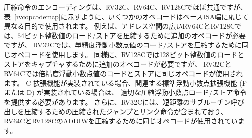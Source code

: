 圧縮命令のエンコーディングは、RV32C、RV64C、RV128Cでほぼ共通ですが、
表~\ref{rvcopcodemap}に示すように、いくつかのオペコードはベースISA幅に応じて異なる目的で使用されます。
例えば、アドレス空間の広いRV64CとRV128Cでは、64ビット整数値のロード/ストアを圧縮するために追加のオペコードが必要ですが、
RV32Cでは、単精度浮動小数点値のロード/ストアを圧縮するために同じオペコードを使用します。
同様に、RV128Cでは128ビット整数値のロードとストアをキャプチャするために追加のオペコードが必要ですが、
RV32CとRV64Cでは倍精度浮動小数点値のロードとストアに同じオペコードが使用されます。
C 拡張機能が実装されている場合、関連する標準浮動小数点拡張機能 (F または D) が実装されている場合は、
適切な圧縮浮動小数点ロード/ストア命令を提供する必要があります。
さらに、RV32Cには、短距離のサブルーチン呼び出しを圧縮するための圧縮されたジャンプとリンク命令が含まれており、
RV64CとRV128CのADDIWを圧縮するために同じオペコードが使用されています。

